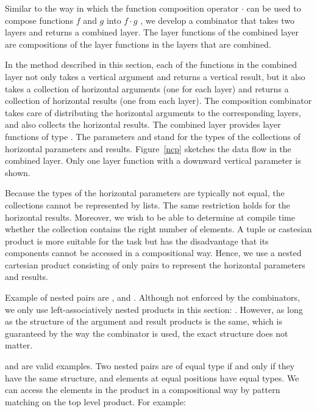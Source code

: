 \documentclass[preprint,natbib]{sigplanconf}
\begin{document}
Similar to the way in which the function composition operator $\cdot$ can be used to compose functions $f$ and $g$ into $f \cdot g$ , we develop a  combinator that takes two layers and returns a combined layer. The layer functions of the combined layer are compositions of the layer functions in the layers that are combined.

In the method described in this section, each of the functions in the combined layer not only takes a vertical argument and returns a vertical result, but it also takes a collection of horizontal arguments (one for each layer) and returns a collection of horizontal results (one from each layer). The composition combinator takes care of distributing the horizontal arguments to the corresponding layers, and also collects the horizontal results. The combined layer provides layer functions of type . The parameters  and  stand for the types of the collections of horizontal parameters and results. Figure~\ref{ncp} sketches the data flow in the combined layer. Only one layer function with a downward vertical parameter is shown.

Because the types of the horizontal parameters are typically not equal, the collections cannot be represented by lists. The same restriction holds for the horizontal results. Moreover, we wish to be able to determine at compile time whether the collection contains the right number of elements. A tuple or castesian product is more suitable for the task but has the disadvantage that its components cannot be accessed in a compositional way. Hence, we use a nested cartesian product consisting of only pairs to represent the horizontal parameters and results.

Example of nested pairs are , and . Although not enforced by the combinators, we only use left-associatively nested products in this section: 
. However, as long as the structure of the argument and result products is the same, which is guaranteed by the way the  combinator is used, the exact structure does not matter.


\bc and  are valid examples.\ec
 \bc Two nested pairs are of equal type if and only if they have the same structure, and elements at equal positions have equal types. We can access the elements in the product in a compositional way by pattern matching on the top level product. For example:  \ec
\end{document}
